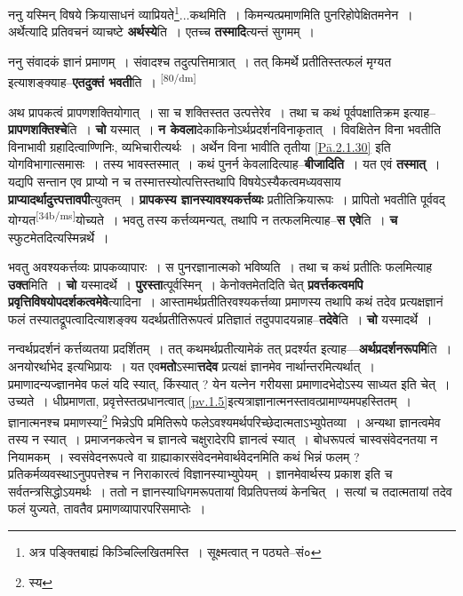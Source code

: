 \documentclass[article,12pt,a4paper]{memoir}
\begin{document}
	  \pstart ननु यस्मिन् विषये क्रियासाधनं व्याप्रियते\footnote{अत्र पङ्क्तिबाह्यं किञ्चिल्लिखितमस्ति । सूक्ष्मत्वात् न पठ्यते--सं०}...कथमिति । किमन्यत्प्रमाणमिति पुनरिहोपेक्षितमनेन । अर्थेत्यादि प्रतिवचनं व्याचष्टे \textbf{अर्थस्ये}ति । एतच्च \textbf{तस्मादि}त्यन्तं सुगमम् ।
	\pend
      

	  \pstart ननु संवादकं ज्ञानं प्रमाणम् । संवादश्च तदुत्पत्तिमात्रात् । तत् किमर्थे प्रतीतिस्तत्फलं मृग्यत इत्याशङ्क्याह--\textbf{एतदुक्तं भवती}ति ।
	\pend
      \leavevmode\textsuperscript{\rmlatinfont\tiny [80/dm]}

	  \pstart अथ प्रापकत्वं प्रापणशक्तियोगात् । सा च शक्तिस्तत उत्पत्तेरेव । तथा च कथं पूर्वपक्षातिक्रम इत्याह--\textbf{प्रापणशक्तिश्चे}ति । \textbf{चो} यस्मात् । \textbf{न केवला}देकाकिनोऽर्थप्रदर्शनविनाकृतात् । विवक्षितेन विना भवतीति विनाभावी ग्रहादित्वाण्णिनिः, व्यभिचारीत्यर्थः । अर्थेन विना भावीति तृतीया \cref{Pā.2.1.30} इति योगविभागात्समासः । तस्य भावस्तस्मात् । कथं पुनर्न केवलादित्याह--\textbf{बीजादिति} । यत एवं \textbf{तस्मात्} । यद्यपि सन्तान एव प्राप्यो न च तस्मात्तस्योत्पत्तिस्तथापि विषयेऽस्यैकत्वमध्यवसाय \textbf{प्राप्यादर्थादुत्त्पत्तावपी}त्युक्तम् । \textbf{प्रापकस्य ज्ञानस्यावश्यकर्त्तव्यः} प्रतीतिक्रियारूपः । प्रापितो भवतीति पूर्ववद् योग्यत\leavevmode\textsuperscript{\rmlatinfont\tiny [34b/ms]}योच्यते । भवतु तस्य कर्त्तव्यमन्यत्, तथापि न तत्फलमित्याह--\textbf{स एवे}ति । \textbf{च} स्फुटमेतदित्यस्मिन्नर्थे ।
	\pend
      

	  \pstart भवतु अवश्यकर्त्तव्यः प्रापकव्यापारः । स पुनरज्ञानात्मको भविष्यति । तथा च कथं प्रतीतिः फलमित्याह \textbf{उक्त}मिति । \textbf{चो} यस्मादर्थे । \textbf{पुरस्ता}त्पूर्वस्मिन् । केनोक्तमेतदिति चेत् \textbf{प्रवर्त्तकत्वमपि प्रवृत्तिविषयोपदर्शकत्वमेवे}त्यादिना । आस्तामर्थप्रतीतिरवश्यकर्त्तव्या प्रमाणस्य तथापि कथं तदेव प्रत्यक्षज्ञानं फलं तस्यातद्रूपत्वादित्याशङ्क्य यदर्थप्रतीतिरूपत्वं प्रतिज्ञातं तदुपपादयन्नाह--\textbf{तदेवे}ति । \textbf{चो} यस्मादर्थे ।
	\pend
      

	  \pstart नन्वर्थप्रदर्शनं कर्त्तव्यतया प्रदर्शितम् । तत् कथमर्थप्रतीत्यामेकं तत् प्रदर्श्यत इत्याह—\textbf{अर्थप्रदर्शनरूपमि}ति । अनयोरर्थाभेद इत्यभिप्रायः । यत एव\textbf{मतो}ऽस्मा\textbf{त्तदेव} प्रत्यक्षं ज्ञानमेव नार्थान्तरमित्यर्थात् । प्रमाणादन्यज्ज्ञानमेव फलं यदि स्यात्, किंस्यात् ? येन यत्नेन गरीयसा प्रमाणादभेदोऽस्य साध्यत इति चेत् । उच्यते । धीप्रमाणता, प्रवृत्तेस्तत्प्रधानत्वात् \cref{pv.1.5}इत्यत्राज्ञानात्मनस्तावत्प्रामाण्यमपहस्तितम् । ज्ञानात्मनश्च प्रमाणस्या\footnote{स्य} भिन्नेऽपि प्रमितिरूपे फलेऽवश्यमर्थपरिच्छेदात्मताऽभ्युपेतव्या । अन्यथा ज्ञानत्वमेव तस्य न स्यात् । प्रमाजनकत्वेन च ज्ञानत्वे चक्षुरादेरपि ज्ञानत्वं स्यात् । बोधरूपत्वं चास्वसंवेदनतया न नियामकम् । स्वसंवेदनरूपत्वे वा ग्राह्याकारसंवेदनमेवार्थवेदनमिति कथं भिन्नं फलम् ? प्रतिकर्मव्यवस्थाऽनुपपत्तेश्च न निराकारत्वं विज्ञानस्याभ्युपेयम् । ज्ञानमेवार्थस्य प्रकाश इति च सर्वतन्त्रसिद्धोऽयमर्थः । ततो न ज्ञानस्याधिगमरूपतायां विप्रतिपत्तव्यं केनचित् । सत्यां च तदात्मतायां तदेव फलं युज्यते, तावतैव प्रमाणव्यापारपरिसमाप्तेः ।
	\pend
      
\end{document}
